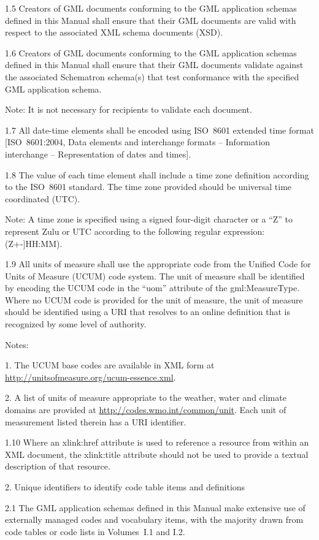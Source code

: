 1.5 Creators of GML documents conforming to the GML application schemas defined in this Manual shall ensure that their GML documents are valid with respect to the associated XML schema documents (XSD).

1.6 Creators of GML documents conforming to the GML application schemas defined in this Manual shall ensure that their GML documents validate against the associated Schematron schema(s) that test conformance with the specified GML application schema.

Note: It is not necessary for recipients to validate each document.

1.7 All date-time elements shall be encoded using ISO~8601 extended time format {[}ISO~8601:2004, Data elements and interchange formats -- Information interchange -- Representation of dates and times{]}.

1.8 The value of each time element shall include a time zone definition according to the ISO~8601 standard. The time zone provided should be universal time coordinated (UTC).

Note: A time zone is specified using a signed four-digit character or a ``Z'' to represent Zulu or UTC according to the following regular expression: (Z\textbar{[}+-{]}HH:MM).

1.9 All units of measure shall use the appropriate code from the Unified Code for Units of Measure (UCUM) code system. The unit of measure shall be identified by encoding the UCUM code in the ``uom'' attribute of the gml:MeasureType. Where no UCUM code is provided for the unit of measure, the unit of measure should be identified using a URI that resolves to an online definition that is recognized by some level of authority.

Notes:

1. The UCUM base codes are available in XML form at \url{http://unitsofmeasure.org/ucum-essence.xml}.

2. A list of units of measure appropriate to the weather, water and climate domains are provided at \url{http://codes.wmo.int/common/unit}. Each unit of measurement listed therein has a URI identifier.

1.10 Where an xlink:href attribute is used to reference a resource from within an XML document, the xlink:title attribute should not be used to provide a textual description of that resource.

2. Unique identifiers to identify code table items and definitions

2.1 The GML application schemas defined in this Manual make extensive use of externally managed codes and vocabulary items, with the majority drawn from code tables or code lists in Volumes~I.1 and I.2.

